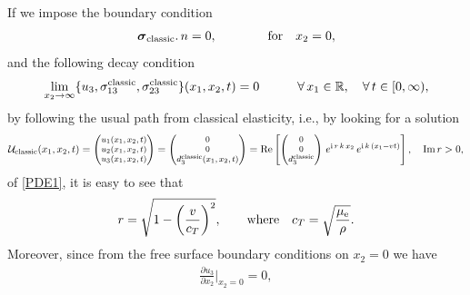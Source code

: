 \documentclass[10pt]{article}
\begin{document}
If we impose the boundary condition
\begin{align}\label{03}
	\boldsymbol{\sigma}_{\rm classic}.\, n=0, \qquad \qquad\textrm{for}\quad x_2=0,
\end{align}
and the following   decay condition
\begin{align}\label{04}
	\lim_{x_2 \rightarrow \infty}\{u_3,\sigma_{13}^{\rm classic},\sigma_{23}^{\rm classic}\} (x_1,x_2,t)=0 \qquad \quad \forall\, x_1\in\mathbb{R}, \quad \forall \, t\in[0,\infty),
\end{align}
by  following the usual path from classical elasticity, i.e., by looking for a solution \begin{align}\label{cx5}
	\mathcal{U}_{\rm classic}(x_1,x_2,t)=\begin{footnotesize}\begin{pmatrix}u_1(x_1,x_2,t)
			\\
			u_2(x_1,x_2,t)
			\\u_3(x_1,x_2,t)
	\end{pmatrix}\end{footnotesize}=\begin{footnotesize}\begin{pmatrix}0
	\\
	0
	\\d_3^{\rm classic}(x_1,x_2,t)
\end{pmatrix}\end{footnotesize}={\rm Re}\left[\begin{footnotesize}\begin{pmatrix} 0
			\\
		0
			\\ d_3^{\rm classic}
	\end{pmatrix}\end{footnotesize} \,e^{{\rm i}\,r\,k\,x_2}\,e^{ {\rm i}\, k\, (  x_1-vt)}\right], \quad \text{Im}\,r>0,
\end{align}
of \eqref{PDE1}, 
it is easy to see \cite{Achenbach} that  
\begin{align}
	r=\sqrt{1-\left(\frac{v}{c_T}\right)^2}, \qquad \text{where}\quad c_T=\sqrt{\frac{\mu_{\rm e}}{\rho}}.
\end{align}
Moreover, since from the free surface boundary  conditions on $x_2=0$ we have
\begin{align}
	\frac{\partial u_3}{\partial x_2}\Big|_{x_2=0}=0,
\end{align}
\end{document}
